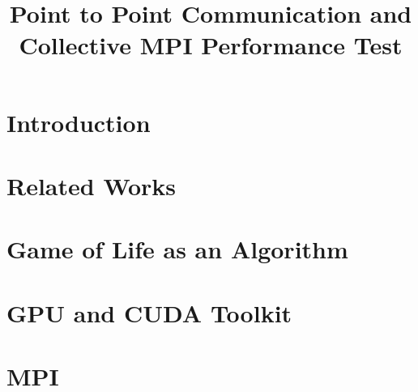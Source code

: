 \documentclass[sigconf,authordraft]{acmart}
\begin{document}
\title{Point to Point Communication and Collective MPI Performance Test}



\renewcommand{\shortauthors}{Yitao Shen, et al.}

\begin{abstract}
  
\end{abstract}



\maketitle

\section{Introduction} \label{introduction}



\section{Related Works} \label{relatedWorks}


\section{Game of Life as an Algorithm} \label{gol}



\section{GPU and CUDA Toolkit} \label{cuda}



\section{MPI} \label{mpi}

\end{document}
